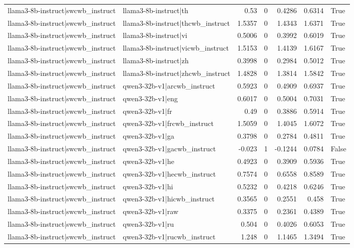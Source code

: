 \begin{table}
\begin{tabular}{l l r r r r l}
llama3-8b-instruct|swcwb_instruct & llama3-8b-instruct|th & 0.53 & 0 & 0.4286 & 0.6314 & True \\
llama3-8b-instruct|swcwb_instruct & llama3-8b-instruct|thcwb_instruct & 1.5357 & 0 & 1.4343 & 1.6371 & True \\
llama3-8b-instruct|swcwb_instruct & llama3-8b-instruct|vi & 0.5006 & 0 & 0.3992 & 0.6019 & True \\
llama3-8b-instruct|swcwb_instruct & llama3-8b-instruct|vicwb_instruct & 1.5153 & 0 & 1.4139 & 1.6167 & True \\
llama3-8b-instruct|swcwb_instruct & llama3-8b-instruct|zh & 0.3998 & 0 & 0.2984 & 0.5012 & True \\
llama3-8b-instruct|swcwb_instruct & llama3-8b-instruct|zhcwb_instruct & 1.4828 & 0 & 1.3814 & 1.5842 & True \\
llama3-8b-instruct|swcwb_instruct & qwen3-32b-v1|arcwb_instruct & 0.5923 & 0 & 0.4909 & 0.6937 & True \\
llama3-8b-instruct|swcwb_instruct & qwen3-32b-v1|eng & 0.6017 & 0 & 0.5004 & 0.7031 & True \\
llama3-8b-instruct|swcwb_instruct & qwen3-32b-v1|fr & 0.49 & 0 & 0.3886 & 0.5914 & True \\
llama3-8b-instruct|swcwb_instruct & qwen3-32b-v1|frcwb_instruct & 1.5059 & 0 & 1.4045 & 1.6072 & True \\
llama3-8b-instruct|swcwb_instruct & qwen3-32b-v1|ga & 0.3798 & 0 & 0.2784 & 0.4811 & True \\
llama3-8b-instruct|swcwb_instruct & qwen3-32b-v1|gacwb_instruct & -0.023 & 1 & -0.1244 & 0.0784 & False \\
llama3-8b-instruct|swcwb_instruct & qwen3-32b-v1|he & 0.4923 & 0 & 0.3909 & 0.5936 & True \\
llama3-8b-instruct|swcwb_instruct & qwen3-32b-v1|hecwb_instruct & 0.7574 & 0 & 0.6558 & 0.8589 & True \\
llama3-8b-instruct|swcwb_instruct & qwen3-32b-v1|hi & 0.5232 & 0 & 0.4218 & 0.6246 & True \\
llama3-8b-instruct|swcwb_instruct & qwen3-32b-v1|hicwb_instruct & 0.3565 & 0 & 0.2551 & 0.458 & True \\
llama3-8b-instruct|swcwb_instruct & qwen3-32b-v1|raw & 0.3375 & 0 & 0.2361 & 0.4389 & True \\
llama3-8b-instruct|swcwb_instruct & qwen3-32b-v1|ru & 0.504 & 0 & 0.4026 & 0.6053 & True \\
llama3-8b-instruct|swcwb_instruct & qwen3-32b-v1|rucwb_instruct & 1.248 & 0 & 1.1465 & 1.3494 & True \\

\end{tabular}
\end{table}
